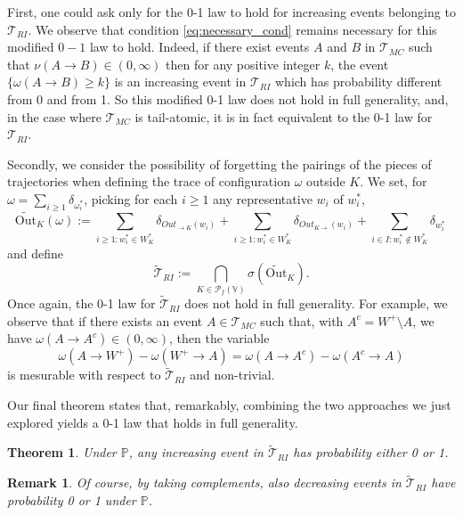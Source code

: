 \documentclass[12pt,a4paper]{article}
\newtheorem{theorem}[theo]{Theorem}
\newtheorem{remark}[theo]{Remark}
\newcommand{\1}[1]{{\mathbf 1}{\{#1\}}}
\newcommand{\8}{{\infty}}
\newcommand{\p}{\mathbb{P}}
\newcommand{\Out}{\mathrm{Out}}
\begin{document}
\smallskip

First, one could ask only for the 0-1 law to hold for increasing events belonging to $\mathcal{T}_{RI}$. We observe that condition \eqref{eq:necessary_cond} remains necessary for this modified $0-1$ law to hold. Indeed, if there exist events $A$ and $B$ in $\mathcal{T}_{MC}$ such that $\nu(A\to B) \in (0, \infty)$ then for any positive integer $k$, the event $\{\omega(A\to B ) \ge k\}$ is an increasing event in $\mathcal{T}_{RI}$ which has probability different from 0 and from 1.
So this modified 0-1 law does not hold in full generality, and, in the case where $\mathcal{T}_{MC}$ is tail-atomic, it is in fact equivalent to the 0-1 law for $\mathcal{T}_{RI}$. 

\smallskip

Secondly, we consider the possibility of forgetting the pairings of the pieces of trajectories when defining the trace of configuration $\omega$ outside $K$.
We set, for $\omega=\sum_{i\ge 1} \delta_{\omega_i^*}$, picking for each $i\ge 1$ any representative $w_i$ of $w_i^*$,
\begin{equation}
\widetilde{\Out}_K(\omega):=\sum_{i\ge 1: w_i^*\in W_K^*} \delta_{Out_{\to K}(w_i)} + \sum_{i\ge 1: w_i^*\in W_K^*} \delta_{Out_{K\to}(w_i)} + \sum_{i\in I : w_i^*\notin W_K^*} \delta_{w_i^*} \, 
\end{equation}
and define 
$$\widetilde{\mathcal{T}}_{RI} := \bigcap_{K \in \mathcal{P}_f(\mathbb{V})} \sigma\left(\widetilde{\Out}_K\right). $$
Once again, the 0-1 law for $\widetilde{\mathcal{T}}_{RI}$ does not hold in full generality. For example, we observe that if there exists an event $A\in \mathcal{T}_{MC}$ such that, with $ A^c= W^+\setminus A$, we have $\omega(A\to  A^c)\in (0, \infty)$, then the variable 
$$\omega(A \to  W^+)-\omega( W^+ \to A) = \omega(A \to  A^c)-\omega( A^c \to A)$$ 
is mesurable with respect to $\widetilde{\mathcal{T}}_{RI}$ and non-trivial. 

\medskip

Our final theorem states that, remarkably, combining the two approaches we just explored yields a 0-1 law that holds in full generality.

\begin{theorem}\label{th:increasing_01law}
  Under $\p$, any increasing event in $\widetilde{\mathcal{T}}_{RI} $ has probability either 0 or 1.
\end{theorem}


\begin{remark}
  Of course, by taking complements, also decreasing events in $\widetilde{\mathcal{T}}_{RI} $ have probability 0 or 1 under $\p$.
\end{remark}
\end{document}
